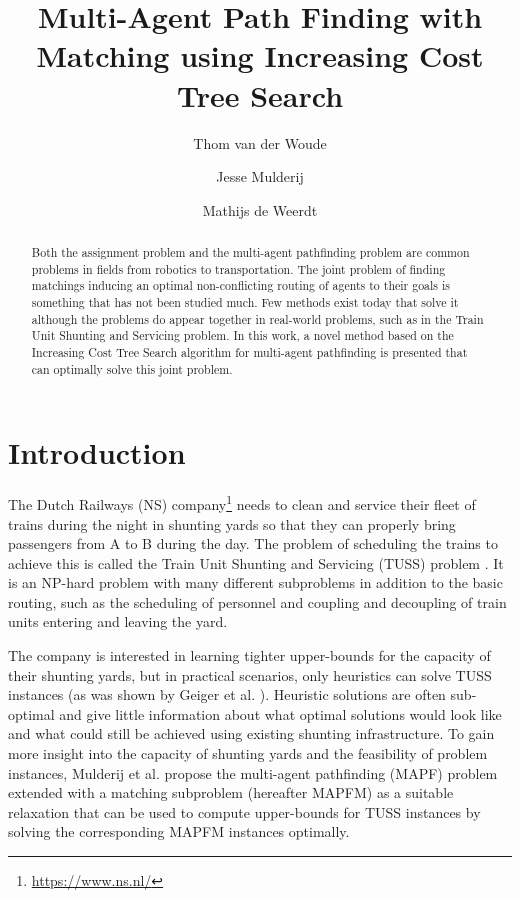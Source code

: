 \documentclass[english]{article}
\begin{document}
	
	\title{Multi-Agent Path Finding with Matching using Increasing Cost Tree Search}
	
	\author{Thom van der Woude\and Jesse Mulderij\and Mathijs de Weerdt}
	\date{}
	
	\maketitle
	
	\begin{abstract}
		Both the assignment problem and the multi-agent pathfinding problem are common problems in fields from robotics to transportation. The joint problem of finding matchings inducing an optimal non-conflicting routing of agents to their goals is something that has not been studied much. Few methods exist today that solve it although the problems do appear together in real-world problems, such as in the Train Unit Shunting and Servicing problem. In this work, a novel method based on the Increasing Cost Tree Search algorithm for multi-agent pathfinding is presented that can optimally solve this joint problem.
	\end{abstract}
	
	\section{Introduction}
	The Dutch Railways (NS) company\footnote{\url{https://www.ns.nl/}} needs to clean and service their fleet of trains during the night in shunting yards so that they can properly bring passengers from A to B during the day. The problem of scheduling the trains to achieve this is called the Train Unit Shunting and Servicing (TUSS) problem \cite{mulderij2020}. It is an NP-hard problem with many different subproblems in addition to the basic routing, such as the scheduling of personnel and coupling and decoupling of train units entering and leaving the yard. %
	
	
	The company is interested in learning tighter upper-bounds for the capacity of their shunting yards, but in practical scenarios, only heuristics can solve TUSS instances (as was shown by Geiger et al. \cite{geiger2018}). Heuristic solutions are often sub-optimal and give little information about what optimal solutions would look like and what could still be achieved using existing shunting infrastructure. To gain more insight into the capacity of shunting yards and the feasibility of problem instances, Mulderij et al. \cite{mulderij2020} propose the multi-agent pathfinding (MAPF) problem \cite{stern2019} extended with a matching subproblem (hereafter MAPFM) as a suitable relaxation that can be used to compute upper-bounds for TUSS instances by solving the corresponding MAPFM instances optimally.
	
\end{document}
